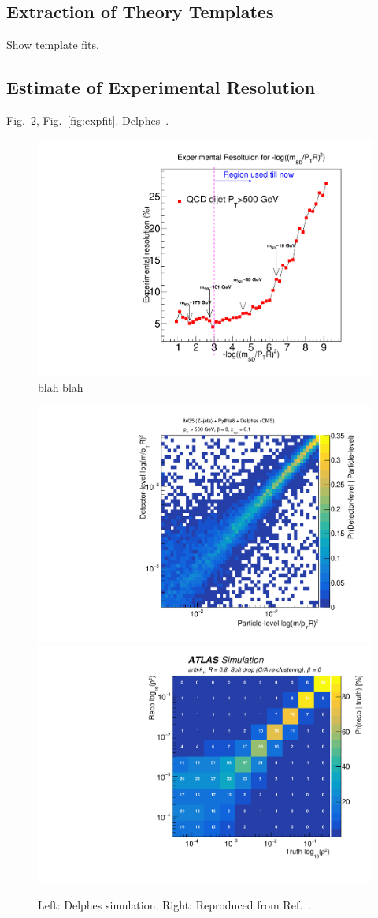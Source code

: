 
\subsection{Extraction of Theory Templates}

	Show template fits.


\subsection{Estimate of Experimental Resolution}

	Fig.~\ref{fig:expres}, Fig.~\ref{fig:expfit}.  Delphes~\cite{deFavereau:2013fsa}.

\begin{figure}
\begin{center}
\includegraphics[width = 0.49\columnwidth]{figures/Experimental_Resolution_logrho.pdf}
\end{center}
\caption{blah blah}
\label{fig:res}
\end{figure}

\begin{figure}
\begin{center}
\includegraphics[width = 0.49\columnwidth]{figures/SD_resolution.pdf}\includegraphics[width = 0.49\columnwidth]{figures/figaux_03a.pdf}
\end{center}
\caption{Left: Delphes simulation; Right: Reproduced from Ref.~\cite{Aaboud:2017qwh}.}
\label{fig:expres}
\end{figure}

